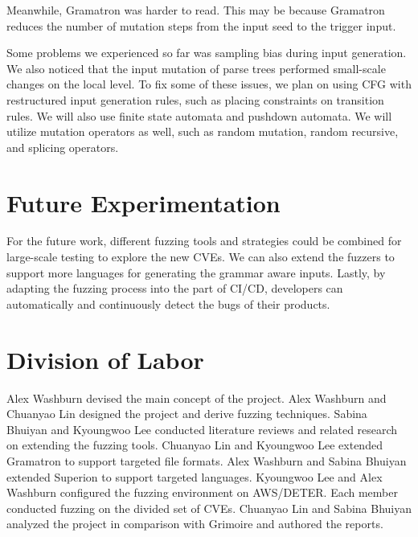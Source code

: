 \documentclass[12pt]{diazessay}
\begin{document}
Meanwhile, Gramatron was harder to read. This may be because Gramatron reduces the number of mutation steps from the input seed to the trigger input. 

Some problems we experienced so far was sampling bias during input generation. We also noticed that the input mutation of parse trees performed small-scale changes on the local level. To fix some of these issues, we plan on using CFG with restructured input generation rules, such as placing constraints on transition rules. We will also use finite state automata and pushdown automata. We will utilize mutation operators as well, such as random mutation, random recursive, and splicing operators.

\section*{Future Experimentation}
For the future work, different fuzzing tools and strategies could be combined for large-scale testing to explore the new CVEs. 
We can also extend the fuzzers to support more languages for generating the grammar aware inputs. 
Lastly, by adapting the fuzzing process into the part of CI/CD, developers can automatically and continuously detect the bugs of their products. 

\section*{Division of Labor}

Alex Washburn devised the main concept of the project.
Alex Washburn and Chuanyao Lin designed the project and derive fuzzing techniques.
Sabina Bhuiyan and Kyoungwoo Lee conducted literature reviews and related research on extending the fuzzing tools.
Chuanyao Lin and Kyoungwoo Lee extended Gramatron to support targeted file formats.
Alex Washburn and Sabina Bhuiyan extended Superion to support targeted languages.
Kyoungwoo Lee and Alex Washburn configured the fuzzing environment on AWS/DETER.
Each member conducted fuzzing on the divided set of CVEs.
Chuanyao Lin and Sabina Bhuiyan analyzed the project in comparison with Grimoire and authored the reports.

\clearpage


\end{document}
